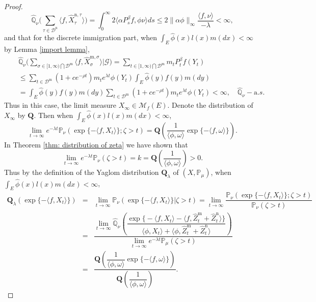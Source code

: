 \documentclass[12pt,a4paper]{amsart}
\numberwithin{equation}{section}
\theoremstyle{plain}
\theoremstyle{definition}
\theoremstyle{remark}
\begin{document}
\begin{proof}
\[
\widehat{\mathbb Q}_{\nu}\big(\sum_{\tau\in \mathcal D^{\mathrm n}}\langle f, \widehat X_{\tau}^{{\mathrm n},\tau} \rangle \big)=\int_0^\infty2\langle \alpha P^{\beta}_sf,\phi\nu\rangle ds
\leq 2\|\alpha\phi\|_\infty\dfrac{\langle f,\nu\rangle }{-\lambda}<\infty,
\]
and that for the discrete immigration part, when $\int_E\hat\phi(x)l(x)m(dx)<\infty$ by Lemma \ref{import lemma},
\begin{eqnarray*}
&&\widehat{\mathbb Q}_{\nu}\Big(\sum_{\sigma\in [1,\infty)\bigcap\mathcal D^{\mathrm m}}\langle f, \widehat X_{\sigma}^{{\mathrm m},\sigma} \rangle\Big|\mathcal G \Big)
=\sum_{t\in [1,\infty)\bigcap\mathcal D^{\mathrm m}}m_tP^{\beta}_tf( Y_t)\\
&&\leq \sum_{t\in \mathcal D^{\mathrm m}}(1+ce^{-\rho t})m_te^{\lambda t}
\phi(Y_t)\int_E\hat\phi(y)f(y)m(dy)\\
&&=\int_E\hat\phi(y)f(y)m(dy) \sum_{t\in \mathcal D^{\mathrm m}}(1+ce^{-\rho t})m_te^{\lambda t}\phi(Y_t)<\infty,\quad \widehat{\mathbb Q}_{\nu}-{\mathrm a.s.}
\end{eqnarray*}
 Thus in this case, the limit measure $X_\infty\in \mathcal M_f(E)$.  Denote the distribution of $X_\infty$ by $\mathbf Q$.  Then when $\int_E\hat\phi(x)l(x)m(dx)<\infty$,
\[
\lim_{t\rightarrow\infty}e^{-\lambda t}\mathbb P_\nu\left(\exp\{-\langle f, X_t\rangle \};\zeta>t\right)=\mathbf Q\left(\frac{1}{\langle\phi, \omega\rangle }\exp\{-\langle f, \omega\rangle \}\right).
\]
In Theorem \ref{thm: distribution of zeta} we have shown that
\[
\lim_{t\rightarrow\infty}e^{-\lambda t}\mathbb P_\nu(\zeta>t)=k={\mathbf Q} \left(\frac{1}{\langle\phi, \omega\rangle }\right)>0.
\]
Thus by the definition of the Yaglom distribution ${\mathbf Q}_\lambda $ of $(X,\mathbb P_\mu)$, when $\int_E\hat\phi(x)l(x)m(dx)<\infty$,
\begin{eqnarray*}
\mathbf Q_\lambda(\exp\{-\langle f, X_t\rangle \})&=&\lim_{t\rightarrow\infty}\mathbb P_\nu\left(\exp\{-\langle f, X_t\rangle \}\Big|\zeta>t\right)=\lim_{t\rightarrow\infty}\dfrac{\mathbb P_\nu\left(\exp\{-\langle f, X_t\rangle \};\zeta>t\right)}{\mathbb P_\nu(\zeta>t)}\\
&=&\dfrac{\lim_{t\rightarrow\infty}\widehat{\mathbb Q}_{\nu}\left(\dfrac{\exp\Big\{-\langle f, X_t\rangle -\langle f,  \widehat Z^{\mathrm m}_t+ \widehat Z^{\mathrm n}_t\rangle\Big \}}{\langle\phi, X_t\rangle +\langle\phi,  \widehat Z^{\mathrm m}_t+ \widehat Z^{\mathrm n}_t\rangle }
\right)}{\lim_{t\rightarrow\infty}e^{-\lambda t}\mathbb P_\mu(\zeta>t)}\\
&=&\dfrac{\mathbf Q\left(\dfrac{1}{\langle\phi, \omega\rangle }\exp\{-\langle f, \omega\rangle \}\right)}{{\mathbf Q}\left(\dfrac{1}{\langle\phi, \omega\rangle }\right)}.

\end{eqnarray*}
\end{proof}
\end{document}
